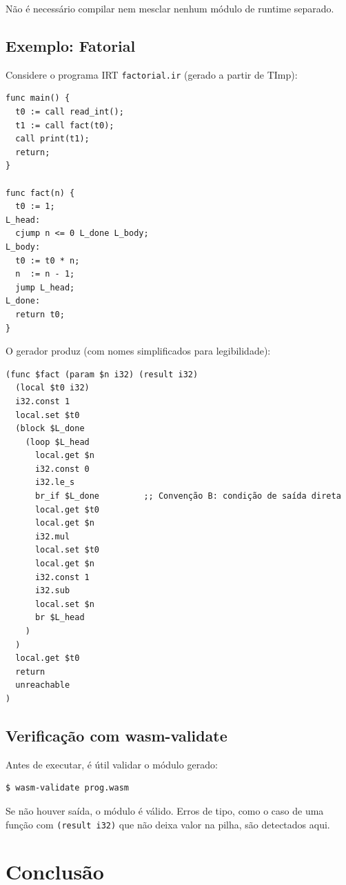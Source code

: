 Não é necessário compilar nem mesclar nenhum módulo de runtime separado.

\subsection{Exemplo: Fatorial}\label{subsec:wat-factorial}

Considere o programa IRT \texttt{factorial.ir} (gerado a partir de TImp):

\begin{verbatim}
func main() {
  t0 := call read_int();
  t1 := call fact(t0);
  call print(t1);
  return;
}

func fact(n) {
  t0 := 1;
L_head:
  cjump n <= 0 L_done L_body;
L_body:
  t0 := t0 * n;
  n  := n - 1;
  jump L_head;
L_done:
  return t0;
}
\end{verbatim}

O gerador produz (com nomes simplificados para legibilidade):

\begin{verbatim}
(func $fact (param $n i32) (result i32)
  (local $t0 i32)
  i32.const 1
  local.set $t0
  (block $L_done
    (loop $L_head
      local.get $n
      i32.const 0
      i32.le_s
      br_if $L_done         ;; Convenção B: condição de saída direta
      local.get $t0
      local.get $n
      i32.mul
      local.set $t0
      local.get $n
      i32.const 1
      i32.sub
      local.set $n
      br $L_head
    )
  )
  local.get $t0
  return
  unreachable
)
\end{verbatim}

\subsection{Verificação com wasm-validate}

Antes de executar, é útil validar o módulo gerado:

\begin{verbatim}
$ wasm-validate prog.wasm
\end{verbatim}

Se não houver saída, o módulo é válido.  Erros de tipo, como o caso de uma
função com \texttt{(result i32)} que não deixa valor na pilha, são
detectados aqui.

\section{Conclusão}\label{sec:wat-conclusao}

